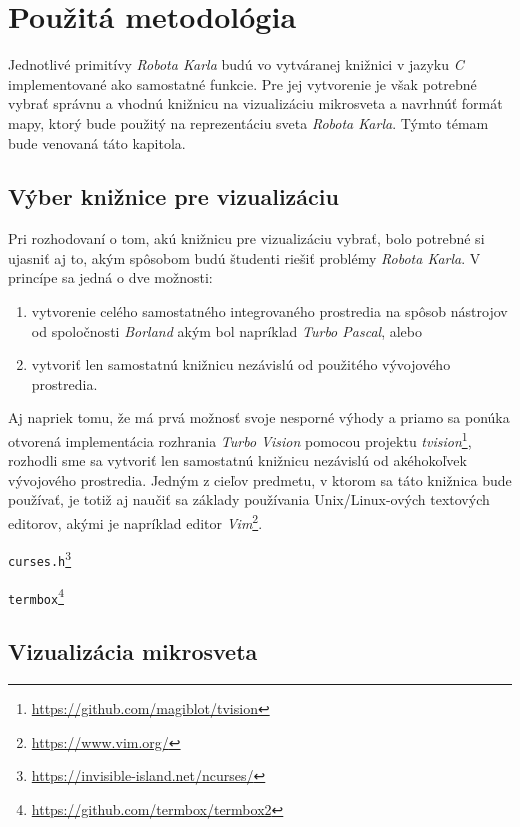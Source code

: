 
\chapter{Použitá metodológia}\label{ch:methodology}

Jednotlivé primitívy \emph{Robota Karla} budú vo vytváranej knižnici v jazyku \emph{C} implementované ako samostatné funkcie. Pre jej vytvorenie je však potrebné vybrať správnu a vhodnú knižnicu na vizualizáciu mikrosveta a navrhnúť formát mapy, ktorý bude použitý na reprezentáciu sveta \emph{Robota Karla}. Týmto témam bude venovaná táto kapitola.


\section{Výber knižnice pre vizualizáciu}

Pri rozhodovaní o tom, akú knižnicu pre vizualizáciu vybrať, bolo potrebné si ujasniť aj to, akým spôsobom budú študenti riešiť problémy \emph{Robota Karla}. V princípe sa jedná o dve možnosti:

\begin{enumerate}
   \item vytvorenie celého samostatného integrovaného prostredia na spôsob nástrojov od spoločnosti \emph{Borland} akým bol napríklad \emph{Turbo Pascal}, alebo

   \item vytvoriť len samostatnú knižnicu nezávislú od použitého vývojového prostredia.
\end{enumerate}

Aj napriek tomu, že má prvá možnosť svoje nesporné výhody a priamo sa ponúka otvorená implementácia rozhrania \emph{Turbo Vision} pomocou projektu \emph{tvision}\footnote{\url{https://github.com/magiblot/tvision}}, rozhodli sme sa vytvoriť len samostatnú knižnicu nezávislú od akéhokoľvek vývojového prostredia. Jedným z cieľov predmetu, v ktorom sa táto knižnica bude používať, je totiž aj naučiť sa základy používania Unix/Linux-ových textových editorov, akými je napríklad editor \emph{Vim}\footnote{\url{https://www.vim.org/}}.

\texttt{curses.h}\footnote{\url{https://invisible-island.net/ncurses/}}

\texttt{termbox}\footnote{\url{https://github.com/termbox/termbox2}}




\section{Vizualizácia mikrosveta}

